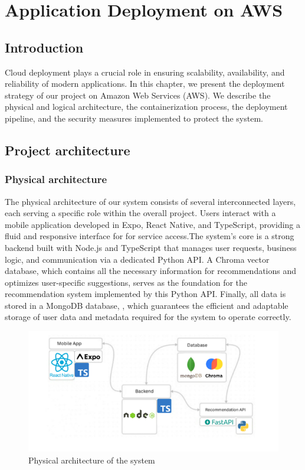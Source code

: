 
\chapter{Application Deployment on AWS}
\section*{Introduction}

Cloud deployment plays a crucial role in ensuring scalability,
availability, and reliability of modern applications. In this chapter,
we present the deployment strategy of our project on Amazon Web
Services (AWS). We describe the physical and logical architecture,
the containerization process, the deployment pipeline, and the
security measures implemented to protect the system.
\newpage
\section{Project architecture}
\subsection{Physical architecture}
The physical architecture of our system consists of several interconnected layers, each serving a specific role within the overall project. Users interact with a mobile application developed in Expo, React Native, and TypeScript, providing a fluid and responsive interface for for service access.The system's core is a strong backend built with Node.js and TypeScript that manages user requests, business logic, and communication via a dedicated Python API.  A Chroma vector database, which contains all the necessary information for recommendations and optimizes user-specific suggestions, serves as the foundation for the recommendation system implemented by this Python API. Finally, all data is stored in a MongoDB database, , which guarantees the efficient and adaptable storage of user data and metadata required for the system to operate correctly.
\begin{center}
\begin{figure}[ht]
            \centering
            \includegraphics[scale=0.72]{images/physic_arch.png}
            \caption{Physical architecture of the system} 
            \label{fig:Physical_architecture}
        \end{figure}
\end{center}
    
